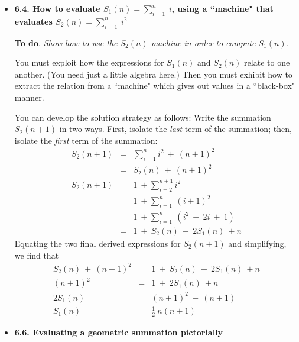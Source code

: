 \begin{itemize}
\item
{\bf 6.4. How to evaluate $S_1(n) = \sum_{i=1}^n \ i$, using a ``machine" that evaluates $S_2(n) = \sum_{i=1}^n \ i^2$}
\smallskip

{\bf To do}. {\em Show how to use the $S_2(n)$-machine in order to compute $S_1(n)$.}

\medskip

You must exploit how the expressions for $S_1(n)$ and $S_2(n)$ relate to one another.  (You need just a little algebra here.)  Then you must exhibit how to extract the relation from a ``machine" which gives out values in a ``black-box" manner.

\smallskip

You can develop the solution strategy as follows:  
Write the summation $S_2(n+1)$ in two ways.  First, isolate the {\em last} term of the summation; then, isolate the {\em first} term of the summation:
\begin{eqnarray*}
S_2(n+1) & = &  \sum_{i=1}^{n} i^2 \ + \ (n+1)^2  \\
                & = & S_2(n) \ + \ (n+1)^2 \\
S_2(n+1) & = & 1 \ + \sum_{i=2}^{n+1} i^2 \\
                & = & 1 \ + \sum_{i=1}^{n} \ (i+1)^2 \\
                & = & 1 \ + \sum_{i=1}^{n} \ (i^2 \ + \ 2 i \ + \ 1) \\
                & = & 1 \ + \ S_2(n) \ + \ 2 S_1(n) \ + n
\end{eqnarray*} 
Equating the two final derived expressions for $S_2(n+1)$ and simplifying, we find that
\begin{eqnarray*}
 S_2(n) \ + \ (n+1)^2 & = & 1 \ + \ S_2(n) \ + \ 2 S_1(n) \ + n \\
                    (n+1)^2 & = & 1 \ + \ 2 S_1(n) \ + n \\
                  2 S_1(n) & = & (n+1)^2 \ - \ (n + 1) \\
                     S_1(n) & =  & \frac{1}{2} \ n(n+1) 
\end{eqnarray*} 

\medskip
\item
{\bf 6.6. Evaluating a geometric summation pictorially}

\smallskip



\end{itemize}
